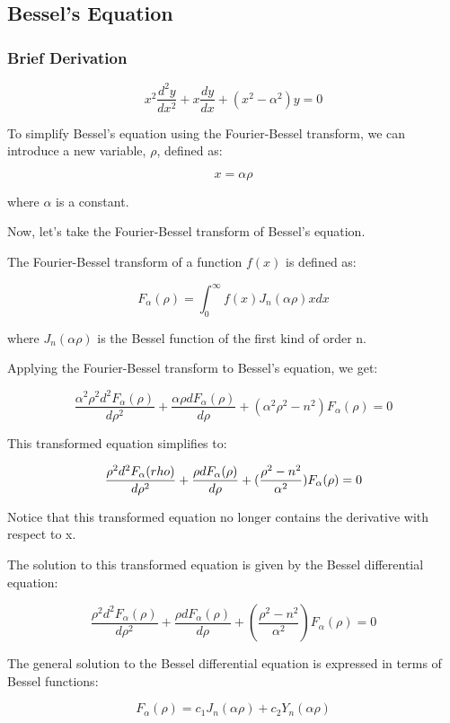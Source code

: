 \subsection{Bessel's Equation}

\subsubsection{Brief Derivation}
\begin{equation}
    x^2 \frac{d^2 y}{dx^2} + x \frac{dy}{dx} + (x^2 - \alpha^2)y = 0
\end{equation}

To simplify Bessel's equation using the Fourier-Bessel transform, we can introduce a new variable, \(\rho\), defined as:

\[ x = \alpha \rho \]

where \(\alpha\) is a constant.

Now, let's take the Fourier-Bessel transform of Bessel's equation. 

The Fourier-Bessel transform of a function \(f(x)\) is defined as:

\[ F_\alpha(\rho) = \int_{0}^{\infty} f(x) J_n(\alpha\rho) x dx \]

where \(J_n(\alpha\rho)\) is the Bessel function of the first kind of order n.

Applying the Fourier-Bessel transform to Bessel's equation, we get:

\[ \frac{\alpha^2 \rho^2 d^2F_\alpha(\rho)}{d\rho^2} + \frac{\alpha\rho dF_\alpha(\rho)}{d\rho} + (\alpha^2 \rho^2 - n^2) F_\alpha(\rho) = 0 \]

This transformed equation simplifies to:

\[ \frac{\rho^2 d^2F_\alpha(\/rho)}{d\rho^2} + \frac{\rho dF_\alpha(\rho)}{d\rho} + (\frac{\rho^2 - n^2}{\alpha^2}) F_\alpha(\rho) = 0 \]

Notice that this transformed equation no longer contains the derivative with respect to x.

The solution to this transformed equation is given by the Bessel differential equation:

\[ \frac{\rho^2 d^2F_\alpha(\rho)}{d\rho^2} + \frac{\rho dF_\alpha(\rho)}{d\rho} + (\frac{\rho^2 - n^2}{\alpha^2}) F_\alpha(\rho) = 0 \]

The general solution to the Bessel differential equation is expressed in terms of Bessel functions:

\[ F_\alpha(\rho) = c_1 J_n(\alpha\rho) + c_2 Y_n(\alpha\rho) \]

